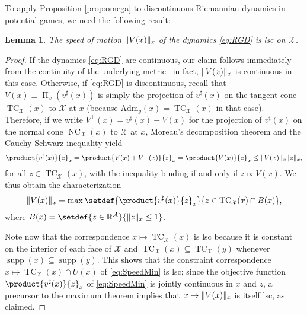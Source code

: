 \documentclass[reqno]{amsart}
\DeclarePairedDelimiter{\norm}{\lVert}{\rVert}
\theoremstyle{plain}
\newtheorem{lemma}[theorem]{Lemma}
\theoremstyle{definition}
\theoremstyle{remark}
\numberwithin{equation}{section}
\numberwithin{theorem}{section}
\begin{document}
To apply Proposition \ref{prop:omega} to discontinuous Riemannian dynamics in potential games, we need the following result:

\begin{lemma}
\label{lem:RLSC}
The speed of motion $\norm{{V}(x)}_{x}$ of the dynamics \eqref{eq:RGD} is \ac{lsc} on ${\mathcal{X}}$.
\end{lemma}

\begin{proof}
If the dynamics \eqref{eq:RGD} are continuous, our claim follows immediately from the continuity of the underlying metric \textendash\ in fact, $\norm{{V}(x)}_{x}$ is continuous in this case.
Otherwise, if \eqref{eq:RGD} is discontinuous, recall that ${V}(x) \equiv \operatorname{\Pi}_{x}({v}^{\sharp}(x))$ is simply the projection of ${v}^{\sharp}(x)$ on the tangent cone $\operatorname{TC}_{\mathcal{X}}(x)$ to ${\mathcal{X}}$ at $x$ (because ${\textrm{Adm}_{g}}(x) = \operatorname{TC}_{\mathcal{X}}(x)$ in that case).
Therefore, if we write ${V}^{\perp}(x) = {v}^{\sharp}(x) - {V}(x)$ for the projection of ${v}^{\sharp}(x)$ on the normal cone $\operatorname{NC}_{\mathcal{X}}(x)$ to ${\mathcal{X}}$ at $x$, Moreau's decomposition theorem and the Cauchy-Schwarz inequality yield
\begin{equation}
\product{{v}^{\sharp}(x)}{z}_{x}
	= \product{{V}(x) + {V}^{\perp}(x)}{z}_{x}
	= \product{{V}(x)}{z}_{x}
	\leq \norm{{V}(x)}_{x} \norm{z}_{x},
\end{equation}
for all $z\in\operatorname{TC}_{\mathcal{X}}(x)$,
with the inequality binding if and only if $z\propto{V}(x)$.
We thus obtain the characterization
\begin{equation}
\label{eq:SpeedMin}
\norm{{V}(x)}_{x}
	= \max \setdef{\product{{v}^{\sharp}(x)}{z}_{x}}{z \in \operatorname{TC}_{\mathcal{X}}(x)\cap{B}(x)},
\end{equation}
where ${B}(x) = \setdef{z\in{\mathbb{R}}^{\mathcal{A}}}{\norm{z}_{x}\leq1}$.

Note now that the correspondence $x \mapsto \operatorname{TC}_{\mathcal{X}}(x)$ is \ac{lsc} because it is constant on the interior of each face of ${\mathcal{X}}$ and  $\operatorname{TC}_{\mathcal{X}}(x) \subseteq \operatorname{TC}_{\mathcal{X}}(y)$ whenever $\operatorname{supp}(x) \subseteq \operatorname{supp}(y)$.
This shows that the constraint correspondence $x \mapsto \operatorname{TC}_{\mathcal{X}}(x) \cap U(x)$ of \eqref{eq:SpeedMin} is \ac{lsc};
since the objective function $\product{{v}^{\sharp}(x)}{z}_{x}$ of \eqref{eq:SpeedMin} is jointly continuous in $x$ and $z$, a precursor to the maximum theorem \citep[Lemma 16.30]{AB99} implies that $x \mapsto \norm{{V}(x)}_{x}$ is itself \ac{lsc}, as claimed.
\end{proof}
\end{document}

